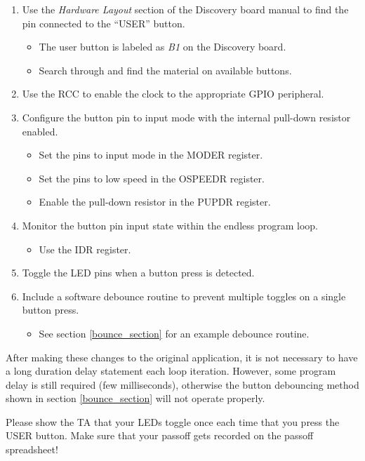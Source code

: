 \documentclass[openany,11pt,fleqn]{book} %
\begin{document}
\begin{enumerate}
    \item Use the \textit{Hardware Layout} section of the Discovery board manual to find the pin connected to the ``USER'' button.
    \begin{itemize}
        \item The user button is labeled as \textit{B1} on the Discovery board.
        \item Search through and find the material on available buttons. 
    \end{itemize}
    \item Use the RCC to enable the clock to the appropriate GPIO peripheral.
    \item Configure the button pin to input mode with the internal pull-down resistor enabled.
    \begin{itemize}
        \item Set the pins to input mode in the MODER register. 
        \item Set the pins to low speed in the OSPEEDR register. 
        \item Enable the pull-down resistor in the PUPDR register. 
    \end{itemize}
    \item Monitor the button pin input state within the endless program loop.
    \begin{itemize}
        \item Use the IDR register.  
    \end{itemize}
    \item Toggle the LED pins when a button press is detected.
    \item Include a software debounce routine to prevent multiple toggles on a single button press.
    \begin{itemize}
        \item See section \ref{bounce_section} for an example debounce routine. 
    \end{itemize}
\end{enumerate}

After making these changes to the original application, it is not necessary to have a long duration delay statement each loop iteration. However, some program delay is still required (few milliseconds), otherwise the button debouncing method shown in section \ref{bounce_section} will not operate properly. 

\begin{assignment}
	Please show the TA that your LEDs toggle once each time that you press the USER button. Make sure that your passoff gets recorded on the passoff spreadsheet!
\end{assignment}
\end{document}
